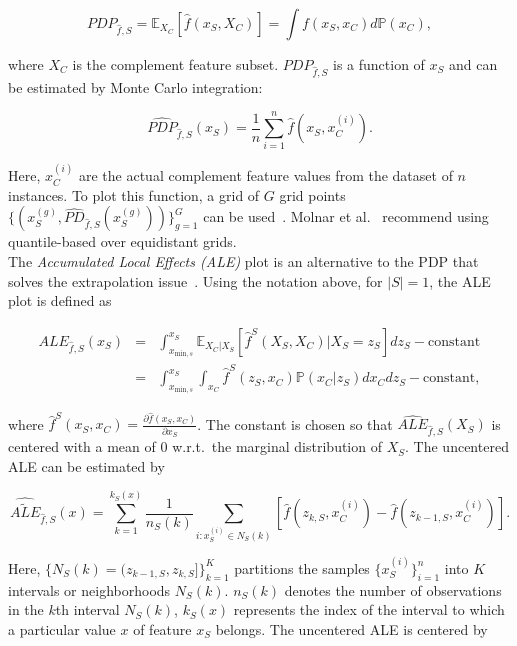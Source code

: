 \documentclass[runningheads]{llncs}
\begin{document}
\begin{equation}
    PDP_{\hat f, S} = \mathbb{E}_{X_C}[\hat{f}(x_S, X_C)] = \int f(x_S, x_C)d\mathbb{P}(x_C),
\end{equation}

\noindent where $X_C$ is the complement feature subset. $PDP_{\hat f, S}$ is a
function of $x_S$ and can be estimated by Monte Carlo integration:

\begin{equation}\label{eq:pdp-estimate}
    \widehat{PDP}_{\hat f, S}(x_S) = \frac{1}{n} \sum_{i=1}^{n} \hat{f}(x_S, x_C^{(i)}).
\end{equation}

\noindent Here, $x_C^{(i)}$ are the actual complement feature values from the dataset of $n$ instances.
To plot this function, a grid of $G$ grid points
$\{(x_S^{(g)}, \widehat{PD}_{\hat f, S}(x_S^{(g)}))\}_{g=1}^G$ can be used~\cite{molnar_relating_2023}.
Molnar et al.~\cite{molnar_general_2022} recommend using quantile-based over equidistant grids.\\

\noindent The \textit{Accumulated Local Effects (ALE)} plot is an alternative to the PDP that
solves the extrapolation issue~\cite{apley_visualizing_2020}. Using the notation above,
for $|S|=1$, the ALE plot is defined as

\begin{eqnarray}
    ALE_{\hat f,S}(x_S) &=& \int_{x_{\text{min},s}}^{x_S} \mathbb{E}_{X_C|X_S}
    \left[\hat{f}^S(X_S, X_C)|X_S = z_S\right] dz_S - \text{constant} \\
    &=& \int_{x_{\text{min},s}}^{x_S} \int_{x_C}
    \hat{f}^S(z_S, x_C)\mathbb{P}(x_C|z_S)dx_{C}dz_{S} - \text{constant},
\end{eqnarray}

\noindent where $\hat{f}^S(x_S, x_C) = \frac{\partial \hat{f}(x_S, x_C)}{\partial x_S}$.
The constant is chosen so that $\widehat{ALE}_{\hat f,S}(X_S)$ is centered with a mean of $0$
w.r.t.\ the marginal distribution of $X_S$. The uncentered ALE can be estimated by

\begin{equation}\label{eq:ale-estimate-uncentered}
    \widehat{\widetilde{ALE}}_{\hat f, S}(x) =
    \sum_{k=1}^{k_S(x)} \frac{1}{n_S(k)} \sum_{i:x_S^{(i)} \in N_S(k)}
    \left[\hat f(z_{k,S}, x_{C}^{(i)}) - \hat f(z_{k-1,S}, x_{C}^{(i)})\right].
\end{equation}

\noindent Here, $\{N_S(k) = (z_{k-1,S}, z_{k,S}]\}_{k=1}^{K}$ partitions the samples
$\{x^{(i)}_S\}_{i=1}^n$ into $K$ intervals or neighborhoods $N_S(k)$. $n_S(k)$ denotes
the number of observations in the $k$th interval $N_S(k)$, $k_S(x)$ represents the index
of the interval to which a particular value $x$ of feature $x_S$ belongs.
The uncentered ALE is centered by
\end{document}
